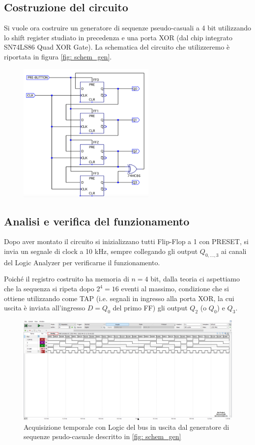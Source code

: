 \documentclass[10pt, a4paper, italian]{article}
\begin{document}
\subsection{Costruzione del circuito}
Si vuole ora costruire un generatore di sequenze pseudo-casuali a 4 bit
utilizzando lo shift register studiato in precedenza e una porta XOR (dal chip
integrato SN74LS86 Quad XOR Gate).
La schematica del circuito che utilizzeremo è riportata in figura
\cref{fig: schem_gen}.
\begin{figure}[htbp]
\centering
	\includegraphics[width=0.6\textwidth]{schem_gen}
\end{figure}

\subsection{Analisi e verifica del funzionamento}
Dopo aver montato il circuito si inizializzano tutti Flip-Flop a 1 con
PRESET, si invia un segnale di clock a 10 kHz, sempre collegando gli output
$Q_{0,\ldots, 3}$ ai canali del Logic Analyzer per verificarne il
funzionamento.

Poiché il registro costruito ha memoria di $n = 4$ bit, dalla teoria ci
aspettiamo che la sequenza si ripeta dopo $2^4 = 16$ eventi al massimo,
condizione che si ottiene utilizzando come TAP (i.e. segnali in ingresso alla
porta XOR, la cui uscita è inviata all'ingresso $D = Q_0$ del primo FF) gli
output $Q_2$ (o $Q_0$) e $Q_3$.
\begin{figure}[htbp]
\centering
	\includegraphics[width=\textwidth]{4.b}
	\caption{Acquisizione temporale con Logic del bus in uscita dal generatore
	di sequenze psudo-casuale descritto in \cref{fig: schem_gen}
	\label{fig: TAP_23}}
\end{figure}
\end{document}
